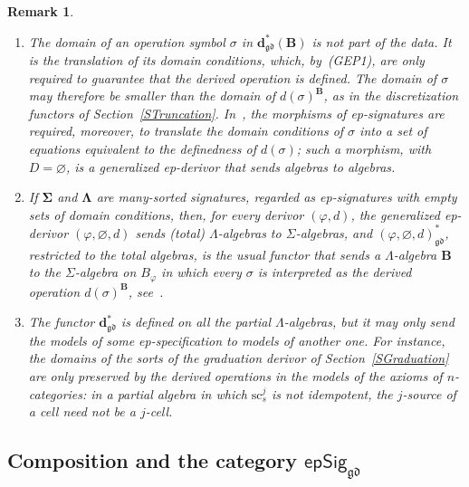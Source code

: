 \documentclass{amsart}
\theoremstyle{plain}
\newtheorem{remark}[theorem]{Remark}
\theoremstyle{definition}
\begin{document}
\begin{remark}\label{RGenEpDerivor}
\begin{enumerate}
\item The domain of an operation symbol $\sigma$ in $\mathbf{d}^{\ast}_{\mathfrak{gd}}(\mathbf{B})$ is not part of the data. It is the translation of its domain conditions, which, by~(GEP1), are only required to guarantee that the derived operation is defined. The domain of $\sigma$ may therefore be smaller than the domain of $d(\sigma)^{\mathbf{B}}$, as in the discretization functors of Section~\ref{STruncation}. In~\cite{Rei87}, the morphisms of ep-signatures are required, moreover, to translate the domain conditions of $\sigma$ into a set of equations equivalent to the definedness of $d(\sigma)$; such a morphism, with $D=\varnothing$, is a generalized ep-derivor that sends algebras to algebras.
\item If $\mathbf{\Sigma}$ and $\mathbf{\Lambda}$ are many-sorted signatures, regarded as ep-signatures with empty sets of domain conditions, then, for every derivor $(\varphi,d)$, the generalized ep-derivor $(\varphi,\varnothing,d)$ sends (total) $\Lambda$-algebras to $\Sigma$-algebras, and $(\varphi,\varnothing,d)^{\ast}_{\mathfrak{gd}}$, restricted to the total algebras, is the usual functor that sends a $\Lambda$-algebra $\mathbf{B}$ to the $\Sigma$-algebra on $B_{\varphi}$ in which every $\sigma$ is interpreted as the derived operation $d(\sigma)^{\mathbf{B}}$, see~\cite{CVST10b}.
\item The functor $\mathbf{d}^{\ast}_{\mathfrak{gd}}$ is defined on all the partial $\Lambda$-algebras, but it may only send the models of some ep-specification to models of another one. For instance, the domains of the sorts of the graduation derivor of Section~\ref{SGraduation} are only preserved by the derived operations in the models of the axioms of $n$-categories: in a partial algebra in which $\mathrm{sc}^{j}_{s}$ is not idempotent, the $j$-source of a cell need not be a $j$-cell.
\end{enumerate}
\end{remark}

\subsection{Composition and the category \texorpdfstring{$\mathsf{epSig}_{\mathfrak{gd}}$}{epSig}}\label{SEpSiggd}
\end{document}
